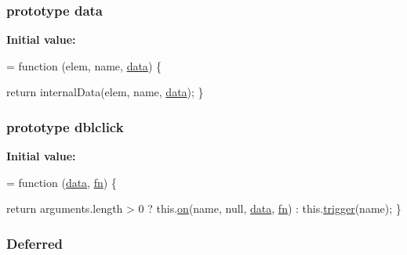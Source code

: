 \subsubsection[{\texorpdfstring{data}{data}}]{ {\bf prototype} data}\hypertarget{jquery-2_82_81-vsdoc_8js_a609407b3456fdc3c5671a9fc4a226ff7}{}\label{jquery-2_82_81-vsdoc_8js_a609407b3456fdc3c5671a9fc4a226ff7}
{\bfseries Initial value\+:}
\begin{DoxyCode}
= \textcolor{keyword}{function} (elem, name, \hyperlink{jquery-2_82_81-vsdoc_8js_a609407b3456fdc3c5671a9fc4a226ff7}{data}) \{
        

        \textcolor{keywordflow}{return} internalData(elem, name, \hyperlink{jquery-2_82_81-vsdoc_8js_a609407b3456fdc3c5671a9fc4a226ff7}{data});
    \}
\end{DoxyCode}
\subsubsection[{\texorpdfstring{dblclick}{dblclick}}]{ {\bf prototype} dblclick}\hypertarget{jquery-2_82_81-vsdoc_8js_a94c0d6e51790b913f3bcdb696d3d2863}{}\label{jquery-2_82_81-vsdoc_8js_a94c0d6e51790b913f3bcdb696d3d2863}
{\bfseries Initial value\+:}
\begin{DoxyCode}
= \textcolor{keyword}{function} (\hyperlink{jquery-2_82_81-vsdoc_8js_a609407b3456fdc3c5671a9fc4a226ff7}{data}, \hyperlink{jquery-2_82_81-vsdoc_8js_acef6bdaf6b9b20fdcca1ea86f0902c3b}{fn}) \{
        

        \textcolor{keywordflow}{return} arguments.length > 0 ?
            this.\hyperlink{jquery-2_82_81-vsdoc_8js_ae453b412b883f60220d73468ef6c6dbc}{on}(name, null, \hyperlink{jquery-2_82_81-vsdoc_8js_a609407b3456fdc3c5671a9fc4a226ff7}{data}, \hyperlink{jquery-2_82_81-vsdoc_8js_acef6bdaf6b9b20fdcca1ea86f0902c3b}{fn}) :
            this.\hyperlink{jquery-2_82_81-vsdoc_8js_a2388c4114d5e3e4eab020f973641519c}{trigger}(name);
    \}
\end{DoxyCode}
\subsubsection[{\texorpdfstring{Deferred}{Deferred}}]{ Deferred}\hypertarget{jquery-2_82_81-vsdoc_8js_ab355ffd82371d88c17da7c1dae9e8829}{}\label{jquery-2_82_81-vsdoc_8js_ab355ffd82371d88c17da7c1dae9e8829}
